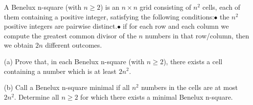 A Benelux n-square (with $n\geq  2$) is an $n\times  n$ grid consisting of $n^2$ cells, each of them containing a positive integer, satisfying the following conditions:$\bullet$ the $n^2$ positive integers are pairwise distinct.$\bullet$ if for each row and each column we compute the greatest common divisor of the $n$ numbers in that row/column, then we obtain $2n$ different outcomes.

(a) Prove that, in each Benelux n-square (with $n \geq 2$), there exists a cell containing a number which is at least $2n^2.$

(b) Call a Benelux n-square minimal if all $n^2$ numbers in the cells are at most $2n^2.$ Determine all $n\geq 2$ for which there exists a minimal Benelux n-square.